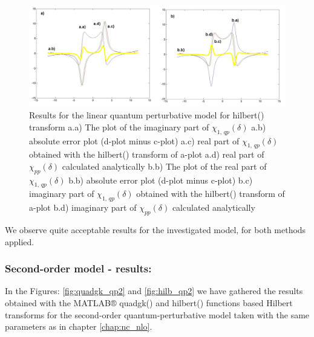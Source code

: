 \documentclass[12pt,twoside,a4paper]{article}
\numberwithin{equation}{subsection}
\numberwithin{figure}{subsection}
\begin{document}
\begin{figure}
  \includegraphics[width=150mm]{img/hilb_qp1.png}
  \caption{Results for the linear quantum perturbative model for hilbert() transform
    a.a) The plot of the imaginary part of ${\chi_{1, \,qp}}(\delta )$
    a.b) absolute error plot (d-plot minus c-plot) 
    a.c) real part of ${\chi_{1, \,qp}}(\delta )$ obtained with the hilbert()  transform of a-plot 
    a.d) real part of ${\chi_{pp}}(\delta )$ calculated analytically 
    b.b) The plot of the real part of ${\chi_{1, \,qp}}(\delta )$ 
    b.b) absolute error plot (d-plot minus c-plot) 
    b.c) imaginary part of ${\chi_{1, \,qp}}(\delta )$ obtained with the hilbert()  transform of a-plot 
    b.d) imaginary part of ${\chi_{pp}}(\delta )$ calculated analytically  
    \label{fig:hilb_qp1}
  }
\end{figure}

We observe quite acceptable results for the investigated model, for both methods applied. 

\subsubsection*{Second-order model - results:}

In the Figures: \ref{fig:quadgk_qp2} and \ref{fig:hilb_qp2} we have gathered the results obtained with the MATLAB® quadgk() and
hilbert() functions based Hilbert transforms for the second-order quantum-perturbative model taken with the same parameters as in
chapter \ref{chap:nc_nlo}.
\end{document}
